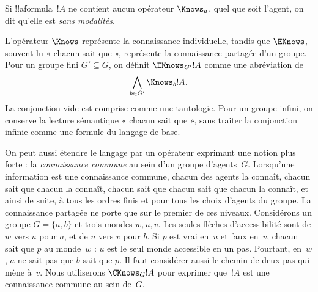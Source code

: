 \documentclass[../../../include/open-logic-section]{subfiles}
\begin{document}
Si !!a{formula}~$!A$ ne contient aucun opérateur $\Knows_a$, quel que
soit l'agent, on dit qu'elle est \emph{sans modalités}.

\begin{defn}
  L'opérateur $\Knows$ représente la connaissance individuelle,
  tandis que $\EKnows$, souvent lu « chacun sait que », représente la
  connaissance partagée d'un groupe. Pour un groupe fini $G' \subseteq G$,
  on définit $\EKnows_{G'} !A$ comme une abréviation de
  \[\bigwedge_{b \in G'} \Knows_b !A.\]
  La conjonction vide est comprise comme une tautologie. Pour un groupe
  infini, on conserve la lecture sémantique « chacun sait que », sans
  traiter la conjonction infinie comme une formule du langage de base.
\end{defn}

On peut aussi étendre le langage par un opérateur exprimant une notion
plus forte : la \emph{connaissance commune} au sein d'un groupe
d'agents~$G$. Lorsqu'une information est une connaissance commune,
chacun des agents la connaît, chacun sait que chacun la connaît,
chacun sait que chacun sait que chacun la connaît, et ainsi de suite,
à tous les ordres finis et pour tous les choix d'agents du groupe.
La connaissance partagée ne porte que sur le premier de ces
niveaux. Considérons un groupe $G=\{a,b\}$ et trois mondes
$w,u,v$. Les seules flèches d'accessibilité sont de $w$ vers $u$
pour $a$, et de $u$ vers $v$ pour $b$. Si $p$ est vrai en~$u$
et faux en~$v$, chacun sait que $p$ au monde~$w$ : $u$ est le
seul monde accessible en un pas. Pourtant, en~$w$, $a$ ne sait
pas que $b$ sait que $p$. Il faut considérer aussi le chemin
de deux pas qui mène à~$v$. Nous utiliserons $\CKnows_G !A$
pour exprimer que~$!A$ est une connaissance commune au sein de~$G$.
\end{document}
